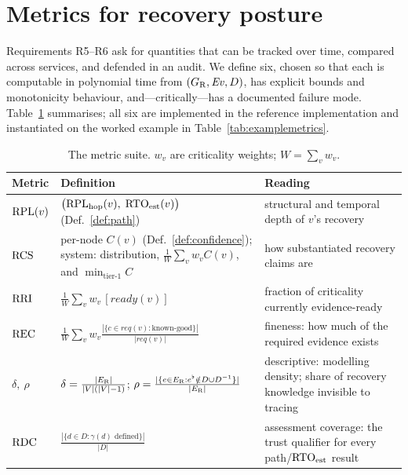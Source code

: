 \section{Metrics for recovery posture}
\label{sec:metrics}

Requirements R5--R6 ask for quantities that can be tracked over time, compared across services, and defended in an audit. We define six, chosen so that each is computable in polynomial time from $(G_{\mathrm{R}}, \mathit{Ev}, D)$, has explicit bounds and monotonicity behaviour, and---critically---has a documented failure mode. Table~\ref{tab:metrics} summarises; all six are implemented in the reference implementation and instantiated on the worked example in Table~\ref{tab:examplemetrics}.

\begin{table}[t]
\centering\small
\caption{The metric suite. $w_v$ are criticality weights; $W = \sum_v w_v$.}
\label{tab:metrics}
\begin{tabularx}{\textwidth}{@{}l l X@{}}
\toprule
\textbf{Metric} & \textbf{Definition} & \textbf{Reading} \\
\midrule
$\mathrm{RPL}(v)$ & $\bigl(\mathrm{RPL}_{\mathrm{hop}}(v),\; \mathrm{RTO}_{\mathrm{est}}(v)\bigr)$ (Def.~\ref{def:path}) & structural and temporal depth of $v$'s recovery \\
$\mathrm{RCS}$ & per-node $C(v)$ (Def.~\ref{def:confidence}); system: distribution, $\tfrac{1}{W}\!\sum_v w_v C(v)$, and $\min_{\text{tier-1}} C$ & how substantiated recovery claims are \\
$\mathrm{RRI}$ & $\tfrac{1}{W} \sum_{v} w_v \,[\mathit{ready}(v)]$ & fraction of criticality currently evidence-ready \\
$\mathrm{REC}$ & $\tfrac{1}{W} \sum_{v} w_v \frac{|\{c \in \mathit{req}(v) : \text{known-good}\}|}{|\mathit{req}(v)|}$ & fineness: how much of the required evidence exists \\
$\delta,\ \rho$ & $\delta = \frac{|E_{\mathrm{R}}|}{|V|(|V|-1)}$;\; $\rho = \frac{|\{e \in E_{\mathrm{R}} : e^\flat \notin D \cup D^{-1}\}|}{|E_{\mathrm{R}}|}$ & descriptive: modelling density; share of recovery knowledge invisible to tracing \\
$\mathrm{RDC}$ & $\frac{|\{d \in D : \gamma(d) \text{ defined}\}|}{|D|}$ & assessment coverage: the trust qualifier for every path/$\mathrm{RTO}_{\mathrm{est}}$ result \\
\bottomrule
\end{tabularx}
\end{table}

